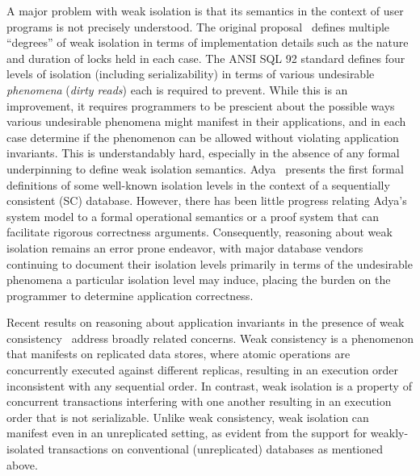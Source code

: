 A major problem with weak isolation is that its semantics in the
context of user programs is not precisely understood. The original
proposal~\cite{gray1976} defines multiple ``degrees'' of weak
isolation in terms of implementation details such as the nature and
duration of locks held in each case. The ANSI SQL 92 standard defines
four levels of isolation (including serializability) in terms of
various undesirable \emph{phenomena} (\eg \emph{dirty reads}) each is
required to prevent. While this is an improvement, it requires
programmers to be prescient about the possible ways various
undesirable phenomena might manifest in their applications, and in
each case determine if the phenomenon can be allowed without violating
application invariants. This is understandably hard, especially in the
absence of any formal underpinning to define weak isolation semantics.
Adya~\cite{adyaphd} presents the first formal definitions of some
well-known isolation levels in the context of a sequentially
consistent (SC) database.  However, there has been little progress
relating Adya's system model to a formal operational semantics or a
proof system that can facilitate rigorous correctness arguments.
Consequently, reasoning about weak isolation remains an error prone
endeavor, with major database vendors~\cite{postgresiso, mysqliso,
  oracleiso} continuing to document their isolation levels primarily
in terms of the undesirable phenomena a particular isolation level may
induce, placing the burden on the programmer to determine application
correctness.

Recent results on reasoning about application invariants in the
presence of weak consistency~\cite{burckhardt14, redblueosdi,
redblueatc, ecinec, gotsmanpopl16} address broadly related concerns.
Weak consistency is a phenomenon that manifests on replicated data
stores, where atomic operations are concurrently executed against
different replicas, resulting in an execution order inconsistent with
any sequential order. In contrast, weak isolation is a property of
concurrent transactions interfering with one another resulting in an
execution order that is not serializable. Unlike weak consistency,
weak isolation can manifest even in an unreplicated setting, as
evident from the support for weakly-isolated transactions on
conventional (unreplicated) databases as mentioned above.


